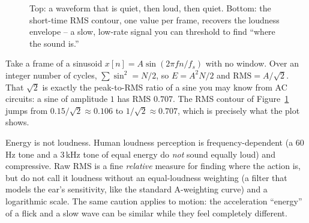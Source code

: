 \begin{figure}[H]
\centering
{}

\vspace{0.3em}

\caption{Top: a waveform that is quiet, then loud, then quiet. Bottom: the
short-time RMS contour, one value per frame, recovers the loudness envelope -- a
slow, low-rate signal you can threshold to find ``where the sound is.''}
\label{ch27:fig-energy}
\end{figure}

\begin{example}
\label{ch27:ex-tone-energy}
Take a frame of a sinusoid $x[n] = A\sin(2\pi f n / f_s)$ with no window. Over an
integer number of cycles, $\sum \sin^2 = N/2$, so $E = A^2 N/2$ and
$\text{RMS} = A/\sqrt{2}$. That $\sqrt{2}$ is exactly the peak-to-RMS ratio of a
sine you may know from AC circuits: a sine of amplitude $1$ has RMS $0.707$. The
RMS contour of Figure~\ref{ch27:fig-energy} jumps from $0.15/\sqrt2 \approx 0.106$
to $1/\sqrt2 \approx 0.707$, which is precisely what the plot shows.
\end{example}

\begin{trapbox}
Energy is not loudness. Human loudness perception is frequency-dependent (a
$60$\,Hz tone and a $3$\,kHz tone of equal energy do \emph{not} sound equally
loud) and compressive. Raw RMS is a fine \emph{relative} measure for finding where
the action is, but do not call it loudness without an equal-loudness weighting
(a filter that models the ear's sensitivity, like the standard A-weighting curve) and a logarithmic scale. The same caution applies to motion: the
acceleration ``energy'' of a flick and a slow wave can be similar while they feel
completely different.
\end{trapbox}

